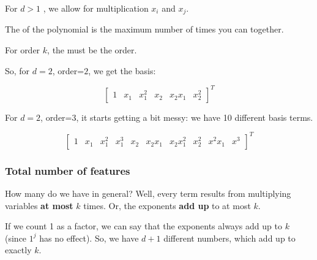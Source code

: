                 \begin{definition}
                    For  $d>1$ , we allow for multiplication  $x_i$ and $x_j$.

                    The  of the polynomial is the maximum number of times you can  together. 
                    
                    For order $k$, the  must be  the order.
                \end{definition}

                So, for $d=2$, order=$2$, we get the basis:

                \begin{equation}
                    \begin{bmatrix}
                        1 & x_1 & x_1^2 & x_2 & x_2x_1 & x_2^2
                    \end{bmatrix}^T
                \end{equation}

                For $d=2$, order=$3$, it starts getting a bit messy: we have 10 different basis terms.

                \begin{equation}
                    \begin{bmatrix}
                        1 & x_1 & x_1^2 & x_1^3 &
                        x_2 & x_2x_1 & x_2x_1^2 & x_2^2 &
                        x^2x_1 & x^3
                    \end{bmatrix}^T
                \end{equation}

            \subsecdiv
            \subsubsection{Total number of features}
        
                How many do we have in general? Well, every term results from multiplying variables \textbf{at most} $k$ times. Or, the exponents \textbf{add up} to at most $k$.
                
                If we count 1 as a factor, we can say that the exponents always add up to $k$ (since $1^j$ has no effect). So, we have $d+1$ different numbers, which add up to exactly $k$.

